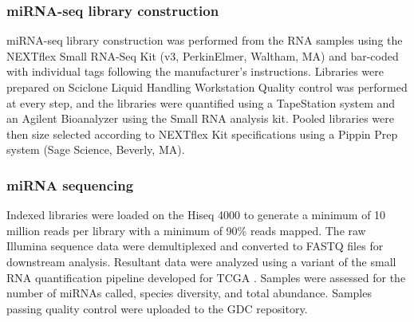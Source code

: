 \subsubsection{miRNA-seq library construction}
miRNA-seq library construction was performed from the RNA samples using the NEXTflex Small RNA-Seq Kit (v3, PerkinElmer, Waltham, MA) and bar-coded with individual tags following the manufacturer’s instructions. Libraries were prepared on Sciclone Liquid Handling Workstation Quality control was performed at every step, and the libraries were quantified using a TapeStation system and an Agilent Bioanalyzer using the Small RNA analysis kit. Pooled libraries were then size selected according to NEXTflex Kit specifications using a Pippin Prep system (Sage Science, Beverly, MA).

\subsubsection{miRNA sequencing}
Indexed libraries were loaded on the Hiseq 4000 to generate a minimum of 10 million reads per library with a minimum of 90\% reads mapped. The raw Illumina sequence data were demultiplexed and converted to FASTQ files for downstream analysis. Resultant data were analyzed using a variant of the small RNA quantification pipeline developed for TCGA \cite{chua_marrama:LargescaleProfiling2016}. Samples were assessed for the number of miRNAs called, species diversity, and total abundance. Samples passing quality control were uploaded to the GDC repository.

